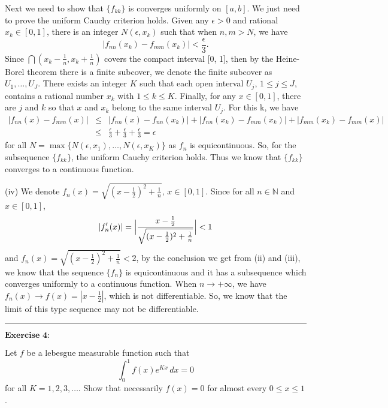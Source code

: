\documentclass[12pt,a4paper]{ctexart}
\begin{document}
Next we need to show that $\{f_{kk}\}$ is converges uniformly on $[a, b]$. We just need to prove the uniform Cauchy criterion holds. Given any $\epsilon > 0$ and rational $x_{k} \in [0, 1]$, there is an integer $N(\epsilon, x_{k})$ such that when $n, m > N$, we have
\begin{equation*}
   |f_{nn}(x_{k}) - f_{mm}(x_{k})| < \frac{\epsilon}{3}.
\end{equation*}
Since $\bigcap (x_{k} - \frac{1}{n}, x_{k} + \frac{1}{n})$ covers the compact interval [0, 1], then by the Heine-Borel theorem there is a finite subcover, we denote the finite subcover as $U_{1}, \dots, U_{J}$. There exists an integer $K$ such that each open interval $U_{j}$, $1 \leq j \leq J$, contains a rational number $x_{k}$ with $1 \leq k \leq K$. Finally, for any $x \in [0, 1]$, there are $j$ and $k$ so that $x$ and $x_{k}$ belong to the same interval $U_{j}$. For this k, we have
\begin{eqnarray*}
|f_{nn}(x) - f_{mm}(x)| & \leq & |f_{nn}(x) - f_{nn}(x_{k})| + |f_{nn}(x_{k}) - f_{mm}(x_{k})| + |f_{mm}(x_{k}) - f_{mm}(x)| \\
& \leq & \frac{\epsilon}{3} + \frac{\epsilon}{3} + \frac{\epsilon}{3} = \epsilon
\end{eqnarray*}
for all $ N = \max\{N(\epsilon,x_{1}), \dots, N(\epsilon,x_{K})\}$ as $f_{n}$ is equicontinuous. So, for the subsequence $\{f_{kk}\}$, the uniform Cauchy criterion holds. Thus we know that $\{f_{kk}\}$ converges to a continuous function.



(iv) We denote $f_{n} (x) = \sqrt{(x - \frac{1}{2})^{2} + \frac{1}{n}}, \, x \in [0, 1]$. Since for all $n \in \mathbb{N}$ and $x \in [0, 1]$,
\begin{equation*}
   |f'_{n}(x)| = \Big{|} \frac{x - \frac{1}{2}}{\sqrt{(x - \frac{1}{2})^{2} + \frac{1}{n}}} \Big{|} < 1
\end{equation*}
and $f_{n} (x) = \sqrt{(x - \frac{1}{2})^{2} + \frac{1}{n}} < 2$, by the conclusion we get from (ii) and (iii), we know that the sequence $\{f_{n}\}$ is equicontinuous and it has a subsequence which converges uniformly to a continuous function. When $n \to + \infty$, we have $f_{n}(x) \to f(x) = |x - \frac{1}{2}|$, which is not differentiable. So, we know that the limit of this type sequence may not be differentiable.

\noindent\rule[0.25\baselineskip]{\textwidth}{0.5pt}

\vspace{8pt}

$\textbf{Exercise 4:}$

Let $f$ be a lebesgue measurable function such that 
\begin{equation*}
   \int_{0}^{1} f(x) e^{Kx} \, d x = 0
\end{equation*}
for all $K = 1, 2, 3, \dots$. Show that necessarily $f(x) = 0$ for almost every $0 \leq x \leq 1$. 
\end{document}
